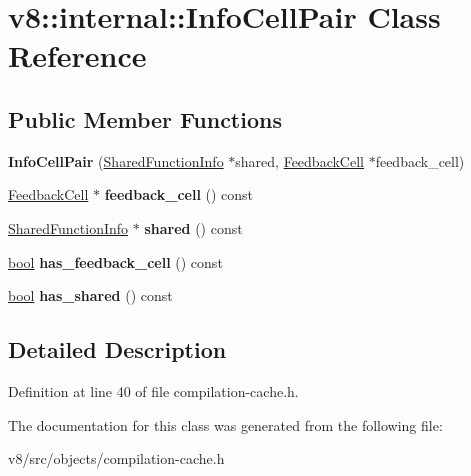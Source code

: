 \hypertarget{classv8_1_1internal_1_1InfoCellPair}{}\section{v8\+:\+:internal\+:\+:Info\+Cell\+Pair Class Reference}
\label{classv8_1_1internal_1_1InfoCellPair}
\subsection*{Public Member Functions}
\begin{DoxyCompactItemize}
\item 
\mbox{\label{classv8_1_1internal_1_1InfoCellPair_ac2697c310707f108da4a4f3bf07cafd5}} 
{\bfseries Info\+Cell\+Pair} (\mbox{\hyperlink{classv8_1_1internal_1_1SharedFunctionInfo}{Shared\+Function\+Info}} $\ast$shared, \mbox{\hyperlink{classv8_1_1internal_1_1FeedbackCell}{Feedback\+Cell}} $\ast$feedback\+\_\+cell)
\item 
\mbox{\label{classv8_1_1internal_1_1InfoCellPair_ab17872518d79a3bdce8e2af024a2580a}} 
\mbox{\hyperlink{classv8_1_1internal_1_1FeedbackCell}{Feedback\+Cell}} $\ast$ {\bfseries feedback\+\_\+cell} () const
\item 
\mbox{\label{classv8_1_1internal_1_1InfoCellPair_a217f6437c1119ecbf900ea928072615b}} 
\mbox{\hyperlink{classv8_1_1internal_1_1SharedFunctionInfo}{Shared\+Function\+Info}} $\ast$ {\bfseries shared} () const
\item 
\mbox{\label{classv8_1_1internal_1_1InfoCellPair_a3af933e051e10613906813cac878f34a}} 
\mbox{\hyperlink{classbool}{bool}} {\bfseries has\+\_\+feedback\+\_\+cell} () const
\item 
\mbox{\label{classv8_1_1internal_1_1InfoCellPair_adcb709d9403ee1747c8c02d5a046a8ca}} 
\mbox{\hyperlink{classbool}{bool}} {\bfseries has\+\_\+shared} () const
\end{DoxyCompactItemize}


\subsection{Detailed Description}


Definition at line 40 of file compilation-\/cache.\+h.



The documentation for this class was generated from the following file\+:\begin{DoxyCompactItemize}
\item 
v8/src/objects/compilation-\/cache.\+h\end{DoxyCompactItemize}

